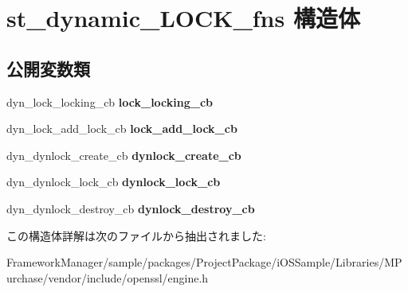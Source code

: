 \hypertarget{structst__dynamic___l_o_c_k__fns}{}\section{st\+\_\+dynamic\+\_\+\+L\+O\+C\+K\+\_\+fns 構造体}
\label{structst__dynamic___l_o_c_k__fns}
\subsection*{公開変数類}
\begin{DoxyCompactItemize}
\item 
\hypertarget{structst__dynamic___l_o_c_k__fns_a495ddb05b36eee18ce44ed977c6f6d8d}{}dyn\+\_\+lock\+\_\+locking\+\_\+cb {\bfseries lock\+\_\+locking\+\_\+cb}\label{structst__dynamic___l_o_c_k__fns_a495ddb05b36eee18ce44ed977c6f6d8d}

\item 
\hypertarget{structst__dynamic___l_o_c_k__fns_aa7178025f352542e04bb37fd3be59396}{}dyn\+\_\+lock\+\_\+add\+\_\+lock\+\_\+cb {\bfseries lock\+\_\+add\+\_\+lock\+\_\+cb}\label{structst__dynamic___l_o_c_k__fns_aa7178025f352542e04bb37fd3be59396}

\item 
\hypertarget{structst__dynamic___l_o_c_k__fns_ad4ec885da11188275dd9e34ef4fe3823}{}dyn\+\_\+dynlock\+\_\+create\+\_\+cb {\bfseries dynlock\+\_\+create\+\_\+cb}\label{structst__dynamic___l_o_c_k__fns_ad4ec885da11188275dd9e34ef4fe3823}

\item 
\hypertarget{structst__dynamic___l_o_c_k__fns_a71056a41e6dd1c75eb00ea605bb4945a}{}dyn\+\_\+dynlock\+\_\+lock\+\_\+cb {\bfseries dynlock\+\_\+lock\+\_\+cb}\label{structst__dynamic___l_o_c_k__fns_a71056a41e6dd1c75eb00ea605bb4945a}

\item 
\hypertarget{structst__dynamic___l_o_c_k__fns_a2a6856844c40ccbb931117bbf775f306}{}dyn\+\_\+dynlock\+\_\+destroy\+\_\+cb {\bfseries dynlock\+\_\+destroy\+\_\+cb}\label{structst__dynamic___l_o_c_k__fns_a2a6856844c40ccbb931117bbf775f306}

\end{DoxyCompactItemize}


この構造体詳解は次のファイルから抽出されました\+:\begin{DoxyCompactItemize}
\item 
Framework\+Manager/sample/packages/\+Project\+Package/i\+O\+S\+Sample/\+Libraries/\+M\+Purchase/vendor/include/openssl/engine.\+h\end{DoxyCompactItemize}
